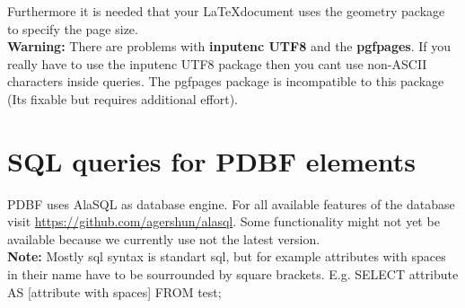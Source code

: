\documentclass[11pt]{article}
\begin{document}
\noindent Furthermore it is needed that your \LaTeX\relax document uses the geometry package to specify the page size.\\

\noindent \textbf{Warning:} There are problems with \textbf{inputenc UTF8} and the \textbf{pgfpages}. If you really have to use the inputenc UTF8 package then you cant use non-ASCII characters inside queries. The pgfpages package is incompatible to this package (Its fixable but requires additional effort). 

\section{SQL queries for PDBF elements}
PDBF uses AlaSQL as database engine. For all available features of the database visit \url{https://github.com/agershun/alasql}. Some functionality might not yet be available because we currently use not the latest version.\\[4pt]
\textbf{Note:} Mostly sql syntax is standart sql, but for example attributes with spaces in their name have to be sourrounded by square brackets. E.g. SELECT attribute AS [attribute with spaces] FROM test;\\
\end{document}
